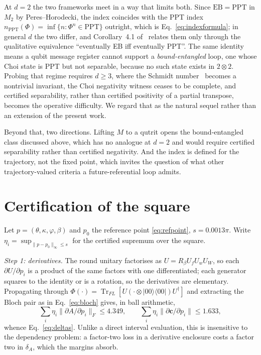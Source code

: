 \documentclass[11pt,a4paper]{article}
\theoremstyle{definition}
\theoremstyle{remark}
\DeclareMathOperator{\Tr}{Tr}
\newcommand{\EB}{\mathrm{EB}}
\newcommand{\PPT}{\mathrm{PPT}}
\providecommand{\ket}[1]{|#1\rangle}
\providecommand{\bra}[1]{\langle#1|}
\begin{document}
At $d=2$ the two frameworks meet in a way that limits both. Since
$\EB=\PPT$ in $M_{2}$ by Peres--Horodecki, the index coincides with the
PPT index $n_{\PPT}(\Phi)=\inf\{n:\Phi^{n}\in\PPT\}$ outright, which is
Eq.~\eqref{eq:indexformula}; in general $d$ the two differ, and
Corollary~4.1 of~\cite{Park2026} relates them only through the qualitative
equivalence ``eventually EB iff eventually PPT''. The
same identity means a qubit message register cannot support a
\emph{bound-entangled} loop, one whose Choi state is PPT but not
separable, because no such state exists in $2\otimes2$. Probing that regime
requires $d\ge3$, where the Schmidt number~\cite{TH00} becomes a nontrivial
invariant, the Choi negativity witness ceases to be complete, and
certified separability, rather than certified positivity of a partial
transpose, becomes the operative difficulty. We regard that as the natural
sequel rather than an extension of the present work.

Beyond that, two directions. Lifting $M$ to a qutrit opens the
bound-entangled class discussed above, which has no analogue
at $d=2$ and would require certified separability rather than certified
negativity. And the index is defined for the trajectory, not the fixed point,
which invites the question of what other trajectory-valued criteria a
future-referential loop admits.

\appendix

\section{Certification of the square}
\label{app:cert}

Let $p=(\theta,\kappa,\varphi,\beta)$ and $p_{0}$ the reference point
\eqref{eq:refpoint}, $s=0.0013\pi$. Write $\eta_{i}=\sup_{\|p-p_{0}\|_\infty\le s}$
for the certified supremum over the square.

\emph{Step 1: derivatives.} The round unitary factorises as
$U=R_{\beta}U_{f}U_{w}U_{W}$, so each $\partial U/\partial p_{i}$ is a product
of the same factors with one differentiated; each generator squares to the
identity or is a rotation, so the derivatives are elementary. Propagating
through $\Phi(\cdot)=\Tr_{FL}[U(\cdot\otimes\ket{00}\bra{00})U^{\dagger}]$ and
extracting the Bloch pair as in Eq.~\eqref{eq:bloch} gives, in ball arithmetic,
\begin{equation}
  \sum_{i}\eta_{i}\|\partial A/\partial p_{i}\|_{F}\le4.349,\qquad
  \sum_{i}\eta_{i}\|\partial\bm{c}/\partial p_{i}\|\le1.633 ,
\end{equation}
whence Eq.~\eqref{eq:deltas}. Unlike a direct interval evaluation, this is
insensitive to the dependency problem: a factor-two loss in a derivative
enclosure costs a factor two in $\delta_{A}$, which the margins absorb.
\end{document}
